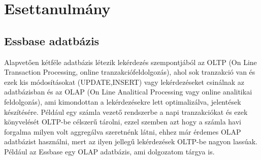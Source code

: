 \chapter{Esettanulmány}\label{sect:Preliminaries}
\section{Essbase adatbázis}
Alapvetően kétféle adatbázis létezik lekérdezés szempontjából az OLTP (On Line
Transaction Processing, online tranzakciófeldolgozás), ahol sok tranzakció van és ezek kis
módosításokat (UPDATE,INSERT) vagy lekérdezéseket csinálnak az
adatbázisban és az OLAP (On Line Analitical Processing vagy online
analitikai feldolgozás), ami kimondottan a lekérdezésekre lett optimalizálva,
jelentések készítésére. Például egy számla vezető rendszerbe a napi
tranzakciókat és ezek könyvelését OLTP-be célszerű tárolni, ezzel szemben azt
hogy a számla havi forgalma milyen volt aggregálva szeretnénk látni, ehhez már
érdemes OLAP adatbázist használni, mert az ilyen jellegű lekérdezések OLTP-be
nagyon lassúak. Például az Essbase egy OLAP adatbázis, ami dolgozatom tárgya
is.
